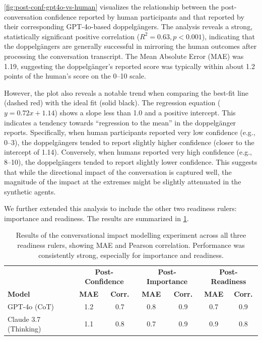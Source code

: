 \cref{fig:post-conf-gpt4o-vs-human} visualizes the relationship between the post-conversation confidence reported by human participants and that reported by their corresponding GPT-4o-based doppelgängers. The analysis reveals a strong, statistically significant positive correlation ($R^2=0.63, p < 0.001$), indicating that the doppelgängers are generally successful in mirroring the human outcomes after processing the conversation transcript. The Mean Absolute Error (MAE) was 1.19, suggesting the doppelgänger's reported score was typically within about 1.2 points of the human's score on the 0--10 scale.

However, the plot also reveals a notable trend when comparing the best-fit line (dashed red) with the ideal fit (solid black). The regression equation ($y=0.72x+1.14$) shows a slope less than 1.0 and a positive intercept. This indicates a tendency towards ``regression to the mean'' in the doppelgänger reports. Specifically, when human participants reported very low confidence (e.g., 0--3), the doppelgängers tended to report slightly higher confidence (closer to the intercept of 1.14). Conversely, when humans reported very high confidence (e.g., 8--10), the doppelgängers tended to report slightly lower confidence. This suggests that while the directional impact of the conversation is captured well, the magnitude of the impact at the extremes might be slightly attenuated in the synthetic agents.

We further extended this analysis to include the other two readiness rulers: importance and readiness. The results are summarized in \cref{tab:autoplay_results_full}.




\begin{table}[!ht]
\centering
\begin{tabular}{l|cc|cc|cc}
\toprule
& \multicolumn{2}{c|}{\textbf{Post-Confidence}} & \multicolumn{2}{c|}{\textbf{Post-Importance}} & \multicolumn{2}{c}{\textbf{Post-Readiness}} \\
\textbf{Model} & \textbf{MAE} & \textbf{Corr.} & \textbf{MAE} & \textbf{Corr.} & \textbf{MAE} & \textbf{Corr.} \\ 
\midrule
GPT-4o (CoT) & 1.2 & 0.7 & 0.8 & 0.9 & 0.7 & 0.9 \\
Claude 3.7 (Thinking) & 1.1 & 0.8 & 0.7 & 0.9 & 0.9 & 0.8 \\ \hline
\end{tabular}
\caption[Multi-ruler conversational impact modelling results]{Results of the conversational impact modelling experiment across all three readiness rulers, showing MAE and Pearson correlation. Performance was consistently strong, especially for importance and readiness.}
\label{tab:autoplay_results_full}
\end{table}


